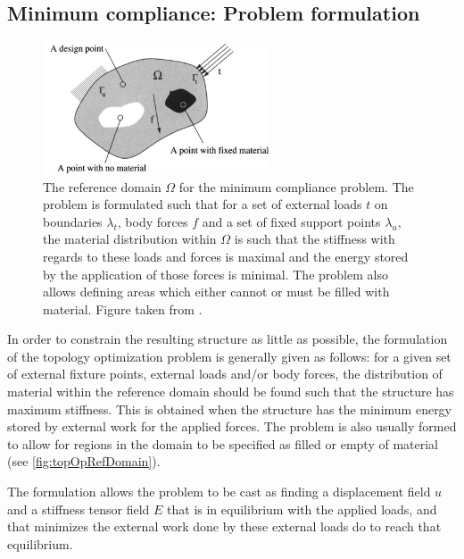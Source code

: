 \subsection{Minimum compliance: Problem formulation}
\begin{figure}
\centering
\includegraphics[width=0.6\textwidth]{Pictures/TopOp/design_domain.png}
\caption{The reference domain $\Omega$ for the minimum compliance problem. The problem is formulated such that for a set of external loads $t$ on boundaries $\lambda_t$, body forces $f$ and a set of fixed support points $\lambda_u$, the material distribution within $\Omega$ is such that the stiffness with regards to these loads and forces is maximal and the energy stored by the application of those forces is minimal. The problem also allows defining areas which either cannot or must be filled with material. Figure taken from \cite{bendsoe2003topology}.}
\label{fig:topOpRefDomain}
\end{figure}
In order to constrain the resulting structure as little as possible, the formulation of the topology optimization problem is generally given as follows: for a given set of external fixture points, external loads and/or body forces, the distribution of material within the reference domain should be found such that the structure has maximum stiffness. This is obtained when the structure has the minimum energy stored by external work for the applied forces. The problem is also usually formed to allow for regions in the domain to be specified as filled or empty of material (see \autoref{fig:topOpRefDomain}). 

The formulation allows the problem to be cast as finding a displacement field $u$ and a stiffness tensor field $E$ that is in equilibrium with the applied loads, and that minimizes the external work done by these external loads do to reach that equilibrium. 

